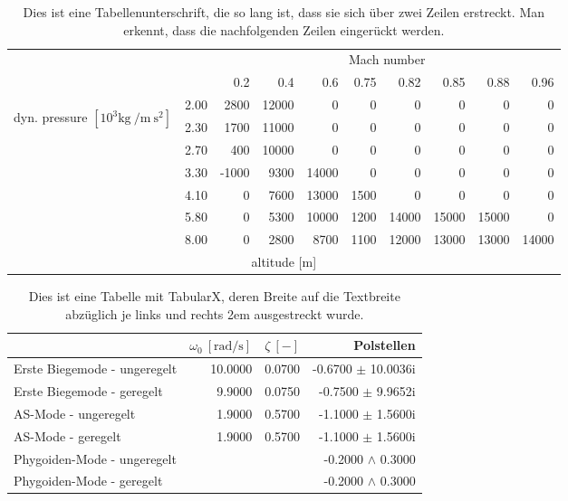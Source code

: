\begin{table}[tb]
\centering
\begin{tabularx}{\textwidth-4em}{m{6mm}Xrrrrrrrr}
\toprule
&		& \multicolumn{8}{c}{Mach number}\\ 
\cmidrule{3-10}
& 		& 0.2	& 0.4	& 0.6	& 0.75	& 0.82	& 0.85	& 0.88& 0.96\\
\midrule %
\multirow{7}{*}{\begin{sideways} dyn. pressure $\mathrm{[10^3 kg\:/m\:s^2]}$ \end{sideways}}%
& 2.00 	& 2800	& 12000	& 0		& 0		& 0		& 0		& 0		& 0	\\
& 2.30 	& 1700	& 11000	& 0		& 0		& 0		& 0		& 0		& 0	\\
& 2.70 	& 400	& 10000	& 0		& 0		& 0		& 0		& 0		& 0	\\
& 3.30 	&-1000	& 9300	& 14000	& 0		& 0		& 0		& 0		& 0	\\
& 4.10 	& 0		& 7600	& 13000	& 1500	& 0		& 0		& 0		& 0	\\
& 5.80 	& 0		& 5300	& 10000	& 1200	& 14000	& 15000	& 15000 & 0	\\
& 8.00 	& 0		& 2800	& 8700	& 1100	& 12000	& 13000	& 13000 & 14000\\
\midrule
\multicolumn{10}{c}{altitude [$\mathrm{m}$]}\\
\bottomrule
\end{tabularx}
\caption{Dies ist eine Tabellenunterschrift, die so lang ist, dass sie sich über zwei Zeilen erstreckt. Man erkennt, dass die nachfolgenden Zeilen eingerückt werden.}
\label{tab:refCase}
\end{table}
\begin{table}[bt]
\centering
\begin{tabularx}{\textwidth-4em}{Xrrr}
\toprule
				&$\omega_0~\mathrm{[rad/s]}$ &$\zeta~\mathrm{[-]}$& Polstellen\\
\midrule
Erste Biegemode - ungeregelt	& 10.0000	& 0.0700	& -0.6700 $\pm$ 10.0036i\\
Erste Biegemode - geregelt		& 9.9000	& 0.0750	& -0.7500 $\pm$ 9.9652i\\[1ex]
AS-Mode - ungeregelt			& 1.9000	& 0.5700	& -1.1000 $\pm$ 1.5600i\\
AS-Mode - geregelt 				& 1.9000	& 0.5700	& -1.1000 $\pm$ 1.5600i \\[1ex]
Phygoiden-Mode - ungeregelt		&			& 			& -0.2000 $\wedge$ 0.3000\\
Phygoiden-Mode - geregelt		&			& 			& -0.2000 $\wedge$ 0.3000\\
\bottomrule
\end{tabularx}
\caption{Dies ist eine Tabelle mit TabularX, deren Breite auf die Textbreite abzüglich je links und rechts 2em ausgestreckt wurde.}
\label{tab:refTabX}
\end{table}
